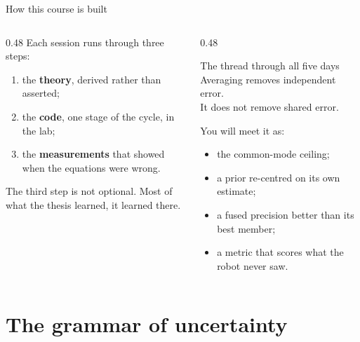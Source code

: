 \documentclass[10pt, aspectratio=169]{beamer}
\begin{document}
\begin{frame}{How this course is built}
  \begin{columns}[T]
    \begin{column}{0.48\textwidth}
      Each session runs through three steps:
      \begin{enumerate}
        \item the \textbf{theory}, derived rather than asserted;
        \item the \textbf{code}, one stage of the cycle, in the lab;
        \item the \textbf{measurements} that showed when the equations were wrong.
      \end{enumerate}
      \vspace{0.5em}
      The third step is not optional. Most of what the thesis learned, it learned there.
    \end{column}
    \begin{column}{0.48\textwidth}
      \begin{block}{The thread through all five days}
        Averaging removes \alert{independent} error.\\
        It does not remove \alert{shared} error.
      \end{block}
      \small
      You will meet it as:
      \begin{itemize}
        \item the common-mode ceiling;
        \item a prior re-centred on its own estimate;
        \item a fused precision better than its best member;
        \item a metric that scores what the robot never saw.
      \end{itemize}
    \end{column}
  \end{columns}
\end{frame}

\section{The grammar of uncertainty}
\end{document}
